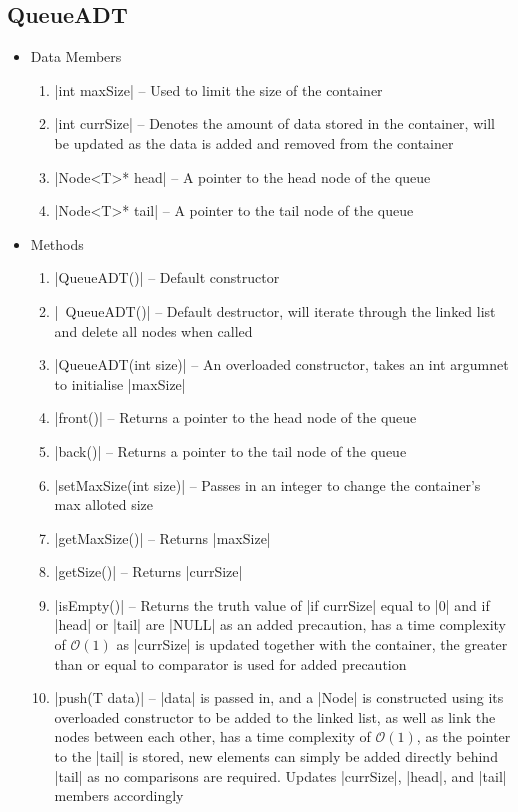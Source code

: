 \documentclass{report}
\begin{document}
\subsection{QueueADT}
\begin{itemize}
	\item Data Members
	\begin{enumerate}
		\item |int maxSize| -- Used to limit the size of the container
		\item |int currSize| -- Denotes the amount of data stored in the container, will be updated as the data is added and removed from the container
		\item |Node<T>* head| -- A pointer to the head node of the queue
		\item |Node<T>* tail| -- A pointer to the tail node of the queue
	\end{enumerate}
	\item Methods
	\begin{enumerate}
		\item |QueueADT()| -- Default constructor
		\item |~QueueADT()| -- Default destructor, will iterate through the linked list and delete all nodes when called
		\item |QueueADT(int size)| -- An overloaded constructor, takes an int argumnet to initialise |maxSize|
		\item |front()| -- Returns a pointer to the head node of the queue
		\item |back()| -- Returns a pointer to the tail node of the queue
		\item |setMaxSize(int size)| -- Passes in an integer to change the container's max alloted size
		\item |getMaxSize()| -- Returns |maxSize|
		\item |getSize()| -- Returns |currSize|
		\item |isEmpty()| -- Returns the truth value of |if currSize| equal to |0| and if |head| or |tail| are |NULL| as an added precaution, has a time complexity of \(\mathcal{O}(1)\) as |currSize| is updated together with the container, the greater than or equal to comparator is used for added precaution
		\item |push(T data)| -- |data| is passed in, and a |Node| is constructed using its overloaded constructor to be added to the linked list, as well as link the nodes between each other, has a time complexity of \(\mathcal{O}(1)\), as the pointer to the |tail| is stored, new elements can simply be added directly behind |tail| as no comparisons are required. Updates |currSize|, |head|, and |tail| members accordingly

\end{enumerate}
\end{itemize}
\end{document}
